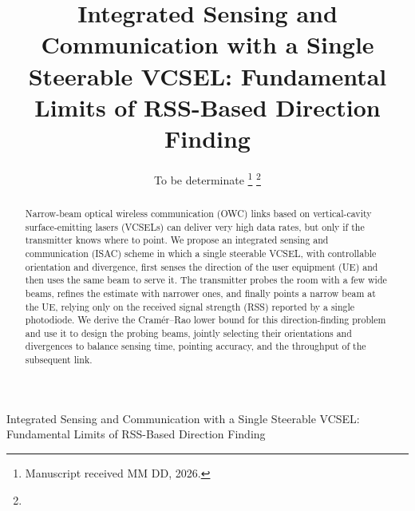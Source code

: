 \documentclass[journal]{IEEEtran}
\begin{document}


\title{Integrated Sensing and Communication with a Single Steerable VCSEL: Fundamental Limits of RSS-Based Direction Finding}


\author{To be determinate
\thanks{Manuscript received MM DD, 2026.
}
\thanks{
}
}
%
{Integrated Sensing and Communication with a Single Steerable VCSEL: Fundamental Limits of RSS-Based Direction Finding}
\maketitle

\begin{abstract}
Narrow-beam optical wireless communication (OWC) links based on
vertical-cavity surface-emitting lasers (VCSELs) can deliver very high
data rates, but only if the transmitter knows where to point. We propose
an integrated sensing and communication (ISAC) scheme in which a single
steerable VCSEL, with controllable orientation and divergence, first
senses the direction of the user equipment (UE) and then uses the same
beam to serve it. The transmitter probes the room with a few wide beams,
refines the estimate with narrower ones, and finally points a narrow beam
at the UE, relying only on the received signal strength (RSS) reported by
a single photodiode. We derive the Cram\'er--Rao lower bound for this
direction-finding problem and use it to design the probing beams, jointly
selecting their orientations and divergences to balance sensing time,
pointing accuracy, and the throughput of the subsequent link.
\end{abstract}
\end{document}
